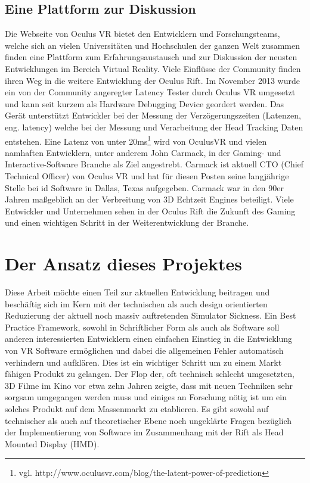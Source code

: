 \documentclass[pagesize, paper=a4, fontsize=12pt,titlepage=true, headings=small, headnosepline, abstractoff, liststotoc, nochapterprefix, plainheadsepline, twoside]{scrreprt}
\begin{document}
\subsection{Eine Plattform zur Diskussion}
Die Webseite von Oculus VR bietet den Entwicklern und Forschungsteams, welche sich an vielen Universitäten und Hochschulen der ganzen Welt zusammen finden eine Plattform zum Erfahrungsaustausch und zur Diskussion der neusten Entwicklungen im Bereich Virtual Reality. Viele Einflüsse der Community finden ihren Weg in die weitere Entwicklung der Oculus Rift. Im November 2013 wurde ein von der Community angeregter Latency Tester durch Oculus VR umgesetzt und kann seit kurzem als Hardware Debugging Device geordert werden. Das Gerät unterstützt Entwickler bei der Messung der Verzögerungszeiten (Latenzen, eng. latency) welche bei der Messung und Verarbeitung der Head Tracking Daten entstehen. Eine Latenz von unter 20ms\footnote{vgl. http://www.oculusvr.com/blog/the-latent-power-of-prediction} wird von OculusVR und vielen namhaften Entwicklern, unter anderem John Carmack, in der Gaming- und Interactive-Software Branche als Ziel angestrebt. Carmack ist aktuell CTO (Chief Technical Officer) von Oculus VR und hat für diesen Posten seine langjährige Stelle bei id Software in Dallas, Texas aufgegeben. Carmack war in den 90er Jahren maßgeblich an der Verbreitung von 3D Echtzeit Engines beteiligt. Viele Entwickler und Unternehmen sehen in der Oculus Rift die Zukunft des Gaming und einen wichtigen Schritt in der Weiterentwicklung der Branche.


\section{Der Ansatz dieses Projektes}
Diese Arbeit möchte einen Teil zur aktuellen Entwicklung beitragen und beschäftig sich im Kern mit der technischen als auch design orientierten Reduzierung der aktuell noch massiv auftretenden Simulator Sickness. Ein Best Practice Framework, sowohl in Schriftlicher Form als auch als Software soll anderen interessierten Entwicklern einen einfachen Einstieg in die Entwicklung von VR Software ermöglichen und dabei die allgemeinen Fehler automatisch verhindern und aufklären. Dies ist ein wichtiger Schritt um zu einem Markt fähigen Produkt zu gelangen. Der Flop der, oft technisch schlecht umgesetzten, 3D Filme im Kino vor etwa zehn Jahren zeigte, dass mit neuen Techniken sehr sorgsam umgegangen werden muss und einiges an Forschung nötig ist um ein solches Produkt auf dem Massenmarkt zu etablieren. Es gibt sowohl auf technischer als auch auf theoretischer Ebene noch ungeklärte Fragen bezüglich der Implementierung von Software im Zusammenhang mit der Rift als Head Mounted Display (HMD).
\end{document}
